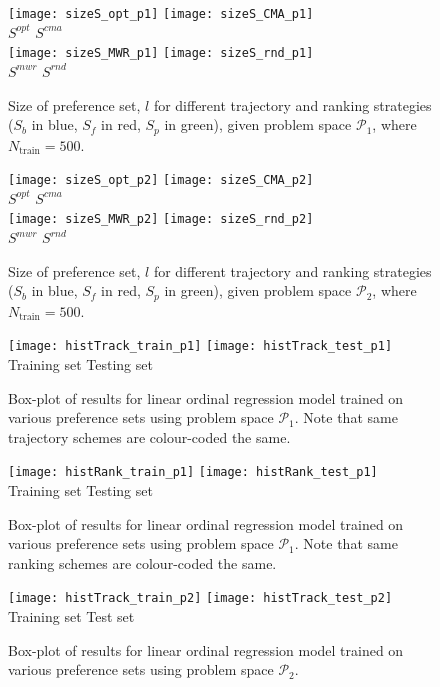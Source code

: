 \documentclass[smallextended]{llncs}
\begin{document}
\begin{figure} \centering
\texttt{[image: sizeS\_opt\_p1]}
\texttt{[image: sizeS\_CMA\_p1]} \\
\hfill $S^{opt}$ \hfill $S^{cma}$  \\
\texttt{[image: sizeS\_MWR\_p1]}
\texttt{[image: sizeS\_rnd\_p1]}\\
\hfill $S^{mwr}$ \hfill $S^{rnd}$
\caption{Size of preference set, $l$ for different trajectory and ranking strategies ($S_b$ in blue, $S_f$ in red, $S_p$ in green), given problem space $\mathcal{P}_1$, where $N_{\text{train}}=500$.}
\label{fig:sizeofprefset:p1}
\end{figure}

\begin{figure} \centering
\texttt{[image: sizeS\_opt\_p2]}
\texttt{[image: sizeS\_CMA\_p2]} \\
\hfill $S^{opt}$ \hfill $S^{cma}$  \\
\texttt{[image: sizeS\_MWR\_p2]}
\texttt{[image: sizeS\_rnd\_p2]}\\
\hfill $S^{mwr}$ \hfill $S^{rnd}$
\caption{Size of preference set, $l$ for different trajectory and ranking strategies ($S_b$ in blue, $S_f$ in red, $S_p$ in green), given problem space $\mathcal{P}_2$, where $N_{\text{train}}=500$.}
\label{fig:sizeofprefset:p2}
\end{figure}

\begin{figure}\flushright \hfill
\texttt{[image: histTrack\_train\_p1]} \hfill
\texttt{[image: histTrack\_test\_p1]} \\
\hfill {Training set }\hfill {Testing set}
\caption{Box-plot of results for linear ordinal regression model trained on various preference sets using problem space $\mathcal{P}_1$. Note that same trajectory schemes are colour-coded the same.}
\label{fig:track:boxplot:p1}
\end{figure}

\begin{figure}\flushright \hfill
\texttt{[image: histRank\_train\_p1]} \hfill
\texttt{[image: histRank\_test\_p1]} \\
\hfill {Training set }\hfill {Testing set}
\caption{Box-plot of results for linear ordinal regression model trained on various preference sets using problem space $\mathcal{P}_1$. Note that same ranking schemes are colour-coded the same.}
\label{fig:rank:boxplot:p1}
\end{figure}
\begin{figure}\flushright \hfill
\texttt{[image: histTrack\_train\_p2]} \hfill
\texttt{[image: histTrack\_test\_p2]} \\
\hfill {Training set } \hfill {Test set }
\caption{Box-plot of results for linear ordinal regression model trained on various preference sets using problem space $\mathcal{P}_2$. }
\label{fig:track:boxplot:p2}
\end{figure}
 
\end{document}
